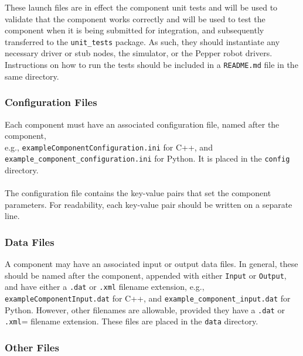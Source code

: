 \documentclass{CSSRforAfrica}
\newcommand{\blank}{~\\}
\begin{document}
\begin{appendices}
These launch files are in effect the component unit tests and will be used to validate that the component works correctly and will be used to test the component when it is being submitted for integration, and subsequently transferred to the   {\small \verb+unit_tests+} package.  As such, they should instantiate any necessary driver or stub nodes, the simulator, or the Pepper robot drivers.   Instructions on how to run the tests should be included in a {\small \verb+README.md+} file in the same directory.

\newpage
\subsubsection{Configuration Files}
Each component must have an associated configuration file, named after the component, \\
e.g.,  {\small \verb+exampleComponentConfiguration.ini+}  for C++, and \\
{\small \verb+example_component_configuration.ini+}  for Python.  It is placed in the  {\small \verb+config+}  directory.
\blank
~
\blank
The configuration file contains the key-value pairs that set the component parameters.  For readability, each key-value pair should be written on a separate line.


\subsubsection{Data Files}

A component may have an associated input or output data files. In general, these should be named after the component, appended with either {\small \verb+Input+} or  {\small \verb+Output+}, and have either a  {\small \verb+.dat+}  or {\small \verb+.xml+}   filename extension, 
e.g.,  {\small \verb+exampleComponentInput.dat+} for C++, and 
{\small \verb+example_component_input.dat+}  for Python. However, other filenames are allowable, provided they have a {\small \verb+.dat+}  or {\small \verb+.xml+}=  filename extension.  These files are placed in the  {\small \verb+data+}  directory.

\subsubsection{Other Files}


\end{appendices}
\end{document}
